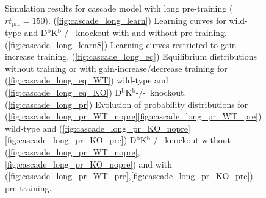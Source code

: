 \documentclass[12pt]{article}
\newcommand{\KO}{D$^\mathrm{b}$K$^\mathrm{b}$-/-}
\begin{document}
\begin{figure}
 \begin{center}
 \begin{myenuma}
  \item{}\label{fig:cascade_long_learn}
  \item{}\label{fig:cascade_long_learnS}
  \item\label{fig:cascade_long_eq}\begin{myenumi}
                    \item{}\label{fig:cascade_long_eq_WT}
                    \item{}\label{fig:cascade_long_eq_KO}
                  \end{myenumi}
  \item\label{fig:cascade_long_pr}\begin{myenumi}
                    \item{}\label{fig:cascade_long_pr_WT_nopre}
                    \item{}\label{fig:cascade_long_pr_WT_pre}
                    \item{}\label{fig:cascade_long_pr_KO_nopre}
                    \item{}\label{fig:cascade_long_pr_KO_pre}
                  \end{myenumi}
 \end{myenuma}
 \end{center}
  \caption{Simulation results for cascade model with long pre-training ($rt_\text{pre}=150$).
  (\ref{fig:cascade_long_learn}) Learning curves for wild-type and \KO\ knockout with and without pre-training.
  (\ref{fig:cascade_long_learnS}) Learning curves restricted to gain-increase training.
  (\ref{fig:cascade_long_eq}) Equilibrium distributions without training or with gain-increase/decrease training for (\ref{fig:cascade_long_eq_WT}) wild-type and (\ref{fig:cascade_long_eq_KO}) \KO\ knockout.
  (\ref{fig:cascade_long_pr}) Evolution of probability distributions for (\ref{fig:cascade_long_pr_WT_nopre}\ref{fig:cascade_long_pr_WT_pre}) wild-type and  (\ref{fig:cascade_long_pr_KO_nopre}\ref{fig:cascade_long_pr_KO_pre}) \KO\ knockout without (\ref{fig:cascade_long_pr_WT_nopre},\ref{fig:cascade_long_pr_KO_nopre}) and with (\ref{fig:cascade_long_pr_WT_pre},\ref{fig:cascade_long_pr_KO_pre}) pre-training. } \label{fig:cascade_long}
\end{figure}
\end{document}

